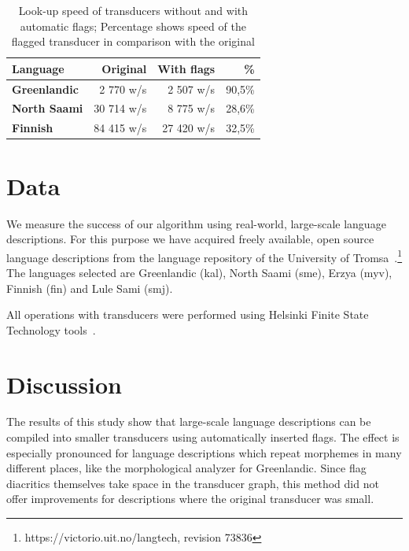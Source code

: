 \documentclass[10pt, a4paper]{article}
\begin{document}
\begin{table}[h]
 \centering
    \begin{tabular}{|l|r|r|r|}
        \hline
        \bf Language & \bf Original & \bf With flags & \bf \% \\
        \hline\hline
        \bf Greenlandic & 2 770 w/s & 2 507 w/s & 90,5\%  \\
        \bf North Saami & 30 714 w/s & 8 775 w/s & 28,6\%  \\
        \bf Finnish  & 84 415 w/s & 27 420 w/s & 32,5\%  \\

        \hline
    \end{tabular}
    \caption{Look-up speed of transducers without and with automatic flags; Percentage shows speed of the flagged transducer in comparison with the original
    \label{table:lookup}}
\end{table}



\section{Data}
\label{sec:data}

We measure the success of our algorithm using real-world, large-scale
language descriptions. For this purpose we have acquired freely
available, open source language descriptions from the language repository of the University of 
Tromsa~\cite{moshagen2013building}.\footnote{https://victorio.uit.no/langtech, revision 73836} The
languages selected are Greenlandic (kal), North Saami (sme), Erzya
(myv), Finnish (fin) and Lule Sami (smj).

All operations with transducers were performed using Helsinki Finite
State Technology tools~\cite{linden2011}.



\section{Discussion}
\label{sec:discussion}

The results of this study show that large-scale language descriptions
can be compiled into smaller transducers using automatically inserted
flags. The effect is especially pronounced for language descriptions
which repeat morphemes in many different places, like the
morphological analyzer for Greenlandic. Since flag diacritics
themselves take space in the transducer graph, this method did not
offer improvements for descriptions where the original
transducer was small.
\end{document}
